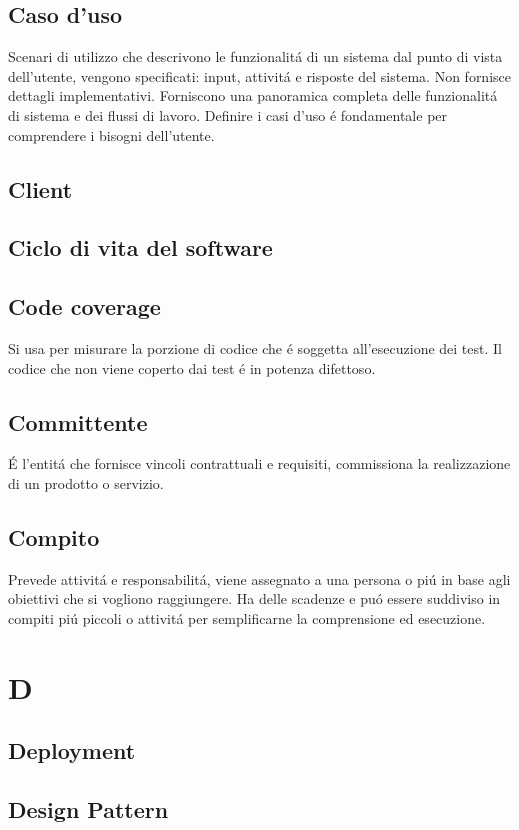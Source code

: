 \documentclass[12pt]{article}
\begin{document}
		\subsection{Caso d'uso}
			Scenari di utilizzo che descrivono le funzionalit\'a di un sistema dal punto di vista dell'utente, vengono specificati: input, attivit\'a e risposte del sistema. Non fornisce dettagli implementativi. Forniscono una panoramica completa delle funzionalit\'a di sistema e dei flussi di lavoro. Definire i casi d'uso \'e fondamentale per comprendere i bisogni dell'utente.
		\subsection{Client} %
			\subsection{Ciclo di vita del software} %
		\subsection{Code coverage}
			Si usa per misurare la porzione di codice che \'e soggetta all'esecuzione dei test. Il codice che non viene coperto dai test \'e in potenza difettoso.
		\subsection{Committente}
			\'E l'entit\'a che fornisce vincoli contrattuali e requisiti, commissiona la realizzazione di un prodotto o servizio.
		\subsection{Compito}
			Prevede attivit\'a e responsabilit\'a, viene assegnato a una persona o pi\'u in base agli obiettivi che si vogliono raggiungere. Ha delle scadenze e pu\'o essere suddiviso in compiti pi\'u piccoli o attivit\'a per semplificarne la comprensione ed esecuzione.
	\clearpage
	\section{D}
		\subsection{Deployment}
		\subsection{Design Pattern}
\end{document}
